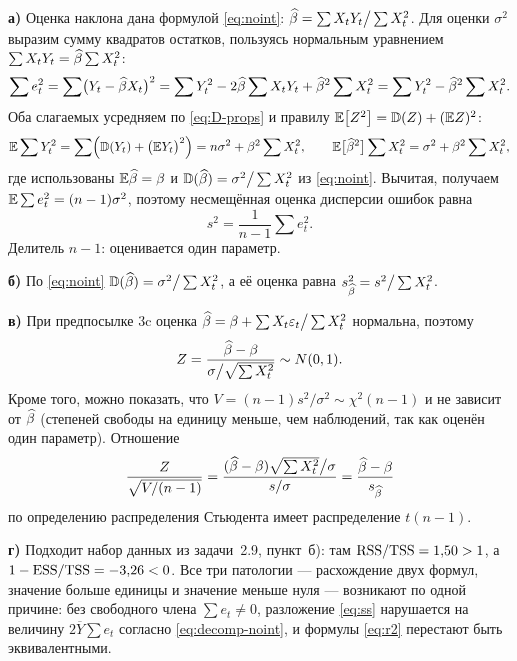 \begin{solution}
\textbf{а)} Оценка наклона дана формулой \eqref{eq:noint}:
$\widehat{\beta} = \sum X_tY_t \big/ \sum X_t^2$. Для оценки $\sigma^2$ выразим сумму
квадратов остатков, пользуясь нормальным уравнением
$\sum X_tY_t = \widehat{\beta}\sum X_t^2$:
\[
  \sum e_t^2 = \sum\bigl(Y_t - \widehat{\beta} X_t\bigr)^2
  = \sum Y_t^2 - 2\widehat{\beta}\sum X_tY_t + \widehat{\beta}^2\sum X_t^2
  = \sum Y_t^2 - \widehat{\beta}^2\sum X_t^2 .
\]
Оба слагаемых усредняем по \eqref{eq:D-props} и правилу
$\mathbb{E}\bigl[Z^2\bigr] = \mathbb{D}(Z) + (\mathbb{E} Z)^2$:
\[
  \mathbb{E}\sum Y_t^2 = \sum\Bigl(\mathbb{D}(Y_t) + \bigl(\mathbb{E} Y_t\bigr)^2\Bigr)
               = n\sigma^2 + \beta^2\sum X_t^2,
  \qquad
  \mathbb{E}\bigl[\widehat{\beta}^2\bigr]\sum X_t^2 = \sigma^2 + \beta^2\sum X_t^2 ,
\]
где использованы $\mathbb{E}\widehat{\beta} = \beta$ и $\mathbb{D}(\widehat{\beta}) = \sigma^2\big/\sum X_t^2$ из
\eqref{eq:noint}. Вычитая, получаем $\mathbb{E}\sum e_t^2 = (n-1)\sigma^2$, поэтому
несмещённая оценка дисперсии ошибок равна
\[
  s^2 = \frac{1}{n-1}\sum e_t^2 .
\]
Делитель $n-1$: оценивается один параметр.

\medskip
\textbf{б)} По \eqref{eq:noint} $\mathbb{D}(\widehat{\beta}) = \sigma^2\big/\sum X_t^2$, а её
оценка равна $s_{\widehat{\beta}}^2 = s^2\big/\sum X_t^2$.

\medskip
\textbf{в)} При предпосылке 3c оценка $\widehat{\beta} = \beta + \sum X_t\varepsilon_t\big/\sum X_t^2$
нормальна, поэтому
\[
  Z = \frac{\widehat{\beta} - \beta}{\sigma\big/\sqrt{\sum X_t^2}} \sim N(0,1).
\]
Кроме того, можно показать, что $V = (n-1)s^2/\sigma^2 \sim \chi^2(n-1)$ и не
зависит от $\widehat{\beta}$ (степеней свободы на единицу меньше, чем наблюдений, так как
оценён один параметр). Отношение
\[
  \frac{Z}{\sqrt{V/(n-1)}}
  = \frac{(\widehat{\beta} - \beta)\sqrt{\sum X_t^2}\big/\sigma}{s/\sigma}
  = \frac{\widehat{\beta} - \beta}{s_{\widehat{\beta}}}
\]
по определению распределения Стьюдента имеет распределение $t(n-1)$.

\medskip
\textbf{г)} Подходит набор данных из задачи~2.9, пункт~б): там
$\mathrm{RSS}/\mathrm{TSS} = 1{,}50 > 1$, а $1 - \mathrm{ESS}/\mathrm{TSS} = -3{,}26 < 0$. Все три патологии —
расхождение двух формул, значение больше единицы и значение меньше нуля —
возникают по одной причине: без свободного члена $\sum e_t \neq 0$, разложение
\eqref{eq:ss} нарушается на величину $2\overline{Y}\sum e_t$ согласно
\eqref{eq:decomp-noint}, и формулы \eqref{eq:r2} перестают быть эквивалентными.
\end{solution}

